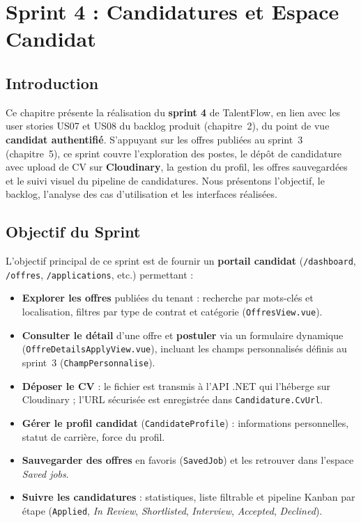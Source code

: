 \chapter{Sprint 4 : Candidatures et Espace Candidat}

\section*{Introduction}

Ce chapitre présente la réalisation du \textbf{sprint 4} de TalentFlow, en lien avec
les user stories US07 et US08 du backlog produit (chapitre~2), du point de vue
\textbf{candidat authentifié}. S'appuyant sur les offres publiées au sprint~3
(chapitre~5), ce sprint couvre l'exploration des postes, le dépôt de candidature
avec upload de CV sur \textbf{Cloudinary}, la gestion du profil, les offres
sauvegardées et le suivi visuel du pipeline de candidatures. Nous présentons
l'objectif, le backlog, l'analyse des cas d'utilisation et les interfaces réalisées.

\section{Objectif du Sprint}

L'objectif principal de ce sprint est de fournir un \textbf{portail candidat}
(\texttt{/dashboard}, \texttt{/offres}, \texttt{/applications}, etc.) permettant :

\begin{itemize}
    \item \textbf{Explorer les offres} publiées du tenant : recherche par mots-clés
    et localisation, filtres par type de contrat et catégorie
    (\texttt{OffresView.vue}).

    \item \textbf{Consulter le détail} d'une offre et \textbf{postuler} via un
    formulaire dynamique (\texttt{OffreDetailsApplyView.vue}), incluant les champs
    personnalisés définis au sprint~3 (\texttt{ChampPersonnalise}).

    \item \textbf{Déposer le CV} : le fichier est transmis à l'API .NET qui
    l'héberge sur Cloudinary ; l'URL sécurisée est enregistrée dans
    \texttt{Candidature.CvUrl}.

    \item \textbf{Gérer le profil candidat} (\texttt{CandidateProfile}) : informations
    personnelles, statut de carrière, force du profil.

    \item \textbf{Sauvegarder des offres} en favoris (\texttt{SavedJob}) et les
    retrouver dans l'espace \textit{Saved jobs}.

    \item \textbf{Suivre les candidatures} : statistiques, liste filtrable et
    pipeline Kanban par étape (\texttt{Applied}, \textit{In Review}, \textit{Shortlisted},
    \textit{Interview}, \textit{Accepted}, \textit{Declined}).
\end{itemize}

